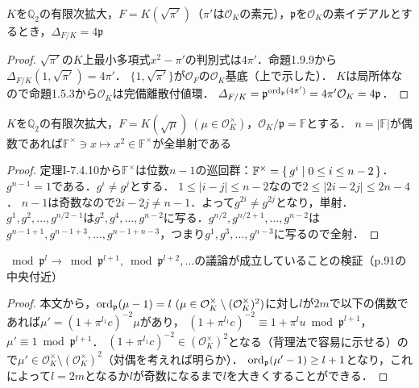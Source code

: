 \begin{screen}
  $K$を$\mathbb{Q}_2$の有限次拡大，$F=K(\sqrt{\pi'})$（$\pi'$は$\mathcal{O}_K$の素元），$\mathfrak{p}$を$\mathcal{O}_K$の素イデアルとするとき，$\varDelta_{F/K}=4\mathfrak{p}$
\end{screen}
\begin{proof}
  $\sqrt{\pi'}$の$K$上最小多項式$x^2-\pi'$の判別式は$4\pi'$．命題1.9.9から$\varDelta_{F/K}(1,\sqrt{\pi'})=4\pi'$．
  $\{1,\sqrt{\pi'}\}$が$\mathcal{O}_F$の$\mathcal{O}_K$基底（上で示した）．
  $K$は局所体なので命題1.5.3から$\mathcal{O}_K$は完備離散付値環．
  $\varDelta_{F/K}=\mathfrak{p}^{\operatorname{ord}_\mathfrak{p}(4\pi')}=4\pi'\mathcal{O}_K=4\mathfrak{p}$．
\end{proof}

\begin{screen}
  $K$を$\mathbb{Q}_2$の有限次拡大，$F=K(\sqrt{\mu})\ (\mu\in\mathcal{O}_K^\times)$，$\mathcal{O}_K/\mathfrak{p}=\mathbb{F}$とする．
  $n=\lvert\mathbb{F}\rvert$が偶数であれば$\mathbb{F}^\times\ni x\mapsto x^2\in\mathbb{F}^\times$が全単射である
\end{screen}
\begin{proof}
  定理I-7.4.10から$\mathbb{F}^\times$は位数$n-1$の巡回群：$\mathbb{F}^\times=\set{g^i | 0\leq i\leq n-2}$．
  $g^{n-1}=1$である．$g^i\neq g^j$とする．
  $1\leq\lvert i-j\rvert\leq n-2$なので$2\leq\lvert 2i-2j\rvert\leq 2n-4$．
  $n-1$は奇数なので$2i-2j\neq n-1$．よって$g^{2i}\neq g^{2j}$となり，単射．
  $g^1,g^2,\ldots,g^{n/2-1}$は$g^2,g^4,\ldots,g^{n-2}$に写る．$g^{n/2},g^{n/2+1},\ldots,g^{n-2}$は$g^{n-1+1},g^{n-1+3},\ldots,g^{n-1+n-3}$，つまり$g^1,g^3,\ldots,g^{n-3}$に写るので全射．
\end{proof}

\begin{screen}
  $\bmod\mathfrak{p}^l \to \bmod\mathfrak{p}^{l+1}, \bmod\mathfrak{p}^{l+2}, \ldots$の議論が成立していることの検証（p.91の中央付近）
\end{screen}
\begin{proof}
  本文から，$\ord_\mathfrak{p}(\mu-1)=l\ (\mu\in\mathcal{O}_K^\times\setminus(\mathcal{O}_K^\times)^2)$に対し$l$が$2m$で以下の偶数であれば$\mu'=(1+\pi^{l_1}c)^{-2}\mu$があり，
  $(1+\pi^{l_1}c)^{-2}\equiv 1+\pi^lu\bmod\mathfrak{p}^{l+1}$，$\mu'\equiv 1\bmod\mathfrak{p}^{l+1}$．
  $(1+\pi^{l_1}c)^{-2}\in(\mathcal{O}_K^\times)^2$となる（背理法で容易に示せる）ので$\mu'\in\mathcal{O}_K^\times\setminus(\mathcal{O}_K^\times)^2$（対偶を考えれば明らか）．
  $\operatorname{ord}_\mathfrak{p}(\mu'-1)\geq l+1$となり，これによって$l=2m$となるか$l$が奇数になるまで$l$を大きくすることができる．
\end{proof}

